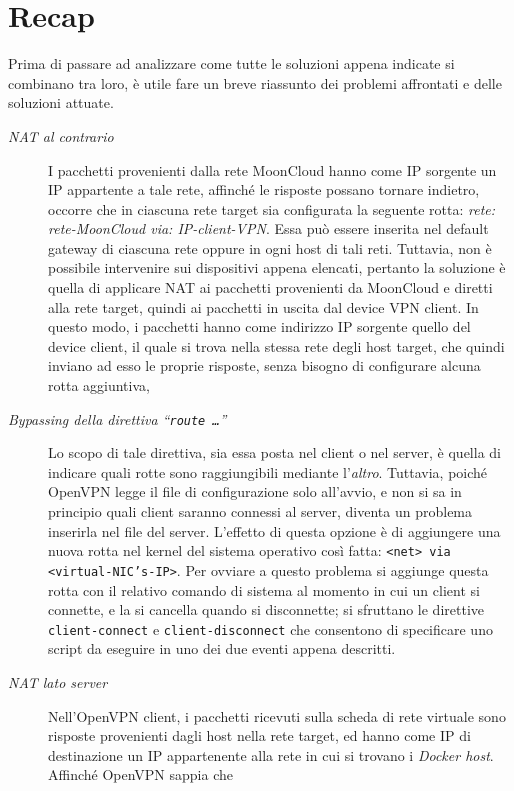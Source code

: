 \section{Recap}
Prima di passare ad analizzare come tutte le soluzioni appena indicate si combinano
tra loro, è utile fare un breve riassunto dei problemi affrontati
e delle soluzioni attuate.
\begin{description}
  \item[\textit{NAT al contrario}]I pacchetti provenienti dalla rete MoonCloud
  hanno come IP sorgente un IP appartente a tale rete, affinché le risposte possano
  tornare indietro, occorre che in ciascuna rete target sia configurata la
  seguente rotta: \textit{rete: rete-MoonCloud via: IP-client-VPN}. Essa può
  essere inserita nel default gateway di ciascuna rete oppure in ogni host di tali reti.
  Tuttavia, non è possibile intervenire sui dispositivi appena elencati, pertanto
  la soluzione è quella di applicare NAT ai pacchetti provenienti da MoonCloud e
  diretti alla rete target, quindi ai pacchetti in uscita dal device VPN client.
  In questo modo, i pacchetti hanno come indirizzo IP sorgente quello del device
  client, il quale si trova nella stessa rete degli host target, che quindi inviano
  ad esso le proprie risposte, senza bisogno di configurare alcuna rotta
  aggiuntiva,
  \item[\textit{Bypassing della direttiva ``\texttt{route \ldots}''}]Lo
  scopo di tale direttiva, sia essa posta nel client o nel server, è quella di
  indicare quali rotte sono raggiungibili mediante l'\textit{altro}. Tuttavia, poiché
  OpenVPN legge il file di configurazione solo all'avvio, e non si sa in principio
  quali client saranno connessi al server, diventa un problema inserirla nel file
  del server. L'effetto di questa opzione è di aggiungere una nuova rotta nel kernel
  del sistema operativo così fatta: \texttt{<net> via <virtual-NIC's-IP>}. Per
  ovviare a questo problema si aggiunge questa rotta con il relativo comando di
  sistema al momento in cui un client si connette, e la si cancella quando si
  disconnette; si sfruttano le direttive \texttt{client-connect} e \texttt{client-disconnect}
  che consentono di specificare uno script da eseguire in uno dei due eventi
  appena descritti.
  \item[\textit{NAT lato server}]Nell'OpenVPN
  client, i pacchetti ricevuti sulla scheda di rete virtuale sono risposte provenienti
  dagli host nella rete target, ed hanno come IP di destinazione un IP appartenente
  alla rete in cui si trovano i \textit{Docker host}. Affinché OpenVPN sappia che

\end{description}
